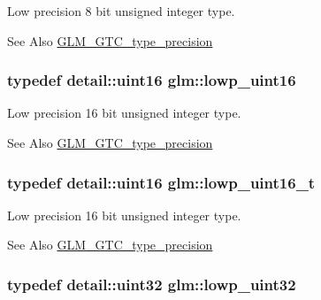 Low precision 8 bit unsigned integer type. \begin{DoxySeeAlso}{See Also}
\hyperlink{group__gtc__type__precision}{G\-L\-M\-\_\-\-G\-T\-C\-\_\-type\-\_\-precision} 
\end{DoxySeeAlso}
\hypertarget{group__gtc__type__precision_ga9b8409887319f62f06e664f6ca121b9d}{
\subsubsection[{lowp\-\_\-uint16}]{\setlength{\rightskip}{0pt plus 5cm}typedef detail\-::uint16 {\bf glm\-::lowp\-\_\-uint16}}}\label{group__gtc__type__precision_ga9b8409887319f62f06e664f6ca121b9d}
Low precision 16 bit unsigned integer type. \begin{DoxySeeAlso}{See Also}
\hyperlink{group__gtc__type__precision}{G\-L\-M\-\_\-\-G\-T\-C\-\_\-type\-\_\-precision} 
\end{DoxySeeAlso}
\hypertarget{group__gtc__type__precision_ga9a71176a4e5bc61951f9e9197d9c80e1}{
\subsubsection[{lowp\-\_\-uint16\-\_\-t}]{\setlength{\rightskip}{0pt plus 5cm}typedef detail\-::uint16 {\bf glm\-::lowp\-\_\-uint16\-\_\-t}}}\label{group__gtc__type__precision_ga9a71176a4e5bc61951f9e9197d9c80e1}
Low precision 16 bit unsigned integer type. \begin{DoxySeeAlso}{See Also}
\hyperlink{group__gtc__type__precision}{G\-L\-M\-\_\-\-G\-T\-C\-\_\-type\-\_\-precision} 
\end{DoxySeeAlso}
\hypertarget{group__gtc__type__precision_gaf11e85af414720b4cd12bd57b3a81e68}{
\subsubsection[{lowp\-\_\-uint32}]{\setlength{\rightskip}{0pt plus 5cm}typedef detail\-::uint32 {\bf glm\-::lowp\-\_\-uint32}}}\label{group__gtc__type__precision_gaf11e85af414720b4cd12bd57b3a81e68}
